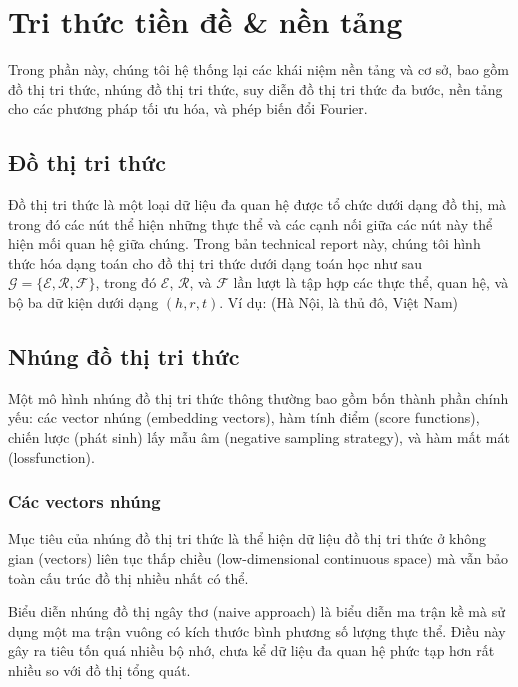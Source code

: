 \section{Tri thức tiền đề \& nền tảng}

Trong phần này, chúng tôi hệ thống lại các khái niệm nền tảng và cơ sở, bao gồm đồ thị tri thức, nhúng đồ thị tri thức, suy diễn đồ thị tri thức đa bước, nền tảng cho các phương pháp tối ưu hóa, và phép biến đổi Fourier.

\subsection{Đồ thị tri thức}

Đồ thị tri thức là một loại dữ liệu đa quan hệ được tổ chức dưới dạng đồ thị, mà trong đó các nút thể hiện những thực thể và các cạnh nối giữa các nút này thể hiện mối quan hệ giữa chúng. Trong bản technical report này, chúng tôi hình thức hóa dạng toán cho đồ thị tri thức dưới dạng toán học như sau $\mathcal{G} = \{\mathcal{E}, \mathcal{R}, \mathcal{F}\}$, trong đó $\mathcal{E}$, $\mathcal{R}$, và $\mathcal{F}$ lần lượt là tập hợp các thực thể, quan hệ, và bộ ba dữ kiện dưới dạng $(h, r, t)$. Ví dụ: (Hà Nội, là thủ đô, Việt Nam)


\subsection{Nhúng đồ thị tri thức}

Một mô hình nhúng đồ thị tri thức thông thường bao gồm bốn thành phần chính yếu: các vector nhúng (embedding vectors), hàm tính điểm (score functions), chiến lược (phát sinh) lấy mẫu âm (negative sampling strategy), và hàm mất mát (lossfunction).

\subsubsection{Các vectors nhúng}

Mục tiêu của nhúng đồ thị tri thức là thể hiện dữ liệu đồ thị tri thức ở không gian (vectors) liên tục thấp chiều (low-dimensional continuous space) mà vẫn bảo toàn cấu trúc đồ thị nhiều nhất có thể.

Biểu diễn nhúng đồ thị ngây thơ (naive approach) là biểu diễn ma trận kề mà sử dụng một ma trận vuông có kích thước bình phương số lượng thực thể. Điều này gây ra tiêu tốn quá nhiều bộ nhớ, chưa kể dữ liệu đa quan hệ phức tạp hơn rất nhiều so với đồ thị tổng quát.

